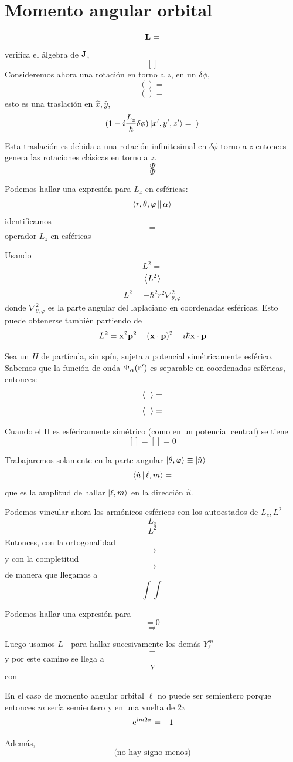 \documentclass[10pt,oneside]{CBFT_book}
\begin{document}
\section{Momento angular orbital}

\[
	\vb{L} =
\]
verifica el álgebra de $\vb{J}$,
\[
	[]
\]
Consideremos ahora una rotación en torno a $z$, en un $\delta\phi$,
\[
	() =
\]
\[
	() = 
\]
esto es una traslación en $\hat{x},\hat{y}$,
\[
	(1-i\frac{L_z}{\hbar}\delta\phi) \Ket{x',y',z'} = \Ket{}
\]

Esta traslación es debida a una rotación infinitesimal en $\delta\phi$ torno a $z$ entonces genera las 
rotaciones clásicas en torno a $z$.
\[
	\Psi 
\]
\[
	\Psi
\]

Podemos hallar una expresión para $L_z$ en esféricas:
\[
	\Braket{r,\theta,\varphi||\alpha}
\]
identificamos 
\[
	= 
\]
operador $L_z$ en esféricas

Usando 
\[
	L^2 = 
\]
\[
	\Braket{L^2}
\]
\[
	L^2 = -\hbar^2 r^2 \nabla^2_{\theta,\varphi}
\]
donde $\nabla^2_{\theta,\varphi}$ es la parte angular del laplaciano en coordenadas esféricas.
Esto puede obtenerse también partiendo de 
\[
	L^2 = \vb{x}^2\vb{p}^2 - (\vb{x}\cdot\vb{p})^2 + i\hbar \vb{x}\cdot\vb{p}
\]

Sea un $H$ de partícula, sin spín, sujeta a potencial simétricamente esférico. Sabemos que la función de onda 
$\Psi_\alpha(\vb{r}')$ es separable en coordenadas esféricas, entonces:
\[
	\Braket{|} = 
\]
\[
	\Braket{|} = 
\]

Cuando el H es esféricamente simétrico (como en un potencial central) se tiene 
\[
	[] = [] = 0
\]

Trabajaremos solamente en la parte angular  $\Ket{\theta,\varphi} \equiv \Ket{\hat{n}}$
\[
	\Braket{\hat{n}|\ell,m} =
\]
que es la amplitud de hallar $\Ket{\ell,m}$ en la dirección $\hat{n}$.

Podemos vincular ahora los armónicos esféricos con los autoestados de $L_z,L^2$
\[
	L_z
\]
\[
	L^2
\]
\[
	=
\]
Entonces, con la ortogonalidad
\[
	\longrightarrow
\]
y con la completitud 
\[
	\longrightarrow
\]
de manera que llegamos a 
\[
	\int \int 
\]

Podemos hallar una expresión para 
\[
	= 0
\]
\[
	\Rightarrow
\]

Luego usamos $L_-$ para hallar sucesivamente los demás $Y^m_\ell$
\[
	=
\]
y por este camino se llega a 
\[
	Y
\]
con 
\[
	\qquad 
\]

En el caso de momento angular orbital $\ell$ no puede ser semientero porque entonces $m$ sería semientero y 
en una vuelta de $2\pi$
\[
	\:\mathrm{e}^{im2\pi} = -1
\]	

Además,
\[
	\text{(no hay signo menos)}
\]


\end{document}
